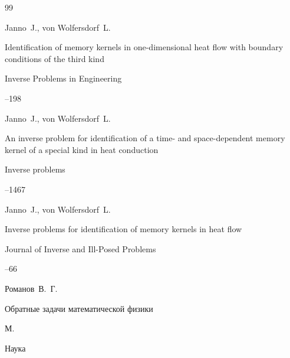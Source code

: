 \begin{thebibliography}{99}

\by Janno~J., von  Wolfersdorf~L. 

\paper Identification of memory kernels in one-dimensional heat flow with boundary conditions of the third kind

\jour Inverse Problems in Engineering 




--198





\by Janno~J., von  Wolfersdorf~L. 

\paper An inverse problem for identification of a time- and space-dependent memory kernel of a special kind in heat conduction

\jour Inverse problems




--1467







\by Janno~J., von  Wolfersdorf~L. 

\paper Inverse problems for identification of memory kernels in heat flow

\jour Journal of Inverse and Ill-Posed Problems




--66







\by Романов~В.~Г.

\book Обратные задачи математической физики

\publaddr М.

\publ Наука





\end{thebibliography}
